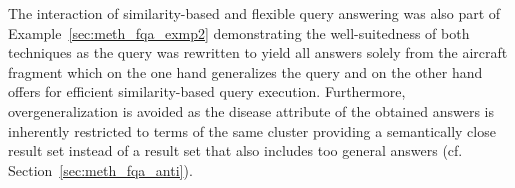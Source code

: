 The interaction of similarity-based and flexible query answering was also part of Example~\ref{sec:meth_fqa_exmp2} demonstrating the well-suitedness of both
techniques as the query was rewritten to yield all answers solely from the aircraft fragment which on the one hand generalizes the query and on the other hand
offers for efficient similarity-based query execution. Furthermore, overgeneralization \citep{Wiese2014} is avoided as the disease attribute of the obtained 
answers is inherently restricted to terms of the same cluster providing a semantically close result set instead of a result set that also includes too general
answers (cf. Section~\ref{sec:meth_fqa_anti}).


